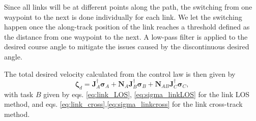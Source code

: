 \documentclass[../main.tex]{subfiles}
\begin{document}
Since all links will be at different points along the path, the switching from one waypoint to the next is done individually for each link. We let the switching happen once the along-track position of the link reaches a threshold defined as the distance from one waypoint to the next. A low-pass filter is applied to the desired course angle to mitigate the issues caused by the discontinuous desired angle.

The total desired velocity calculated from the control law is then given by
\begin{equation}
    \label{eq:zeta_d}
    \bm{\zeta}_d = \bm{J}_A^{\dagger} \bm{\sigma}_A
    + \bm{N}_A \bm{J}_B^{\dagger} \bm{\sigma}_B
    + \bm{N}_{AB} \bm{J}_C^{\dagger} \bm{\sigma}_C,
\end{equation}
with task $B$ given by eqs. \eqref{eq:link_LOS}, \eqref{eq:sigma_linkLOS} for the link LOS method, and eqs. \eqref{eq:link_cross},\eqref{eq:sigma_linkcross} for the link cross-track method.



\end{document}
